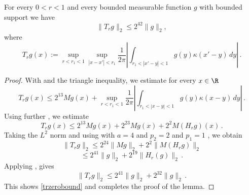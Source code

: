 \begin{lemma}\label{simple-nontangential-Hilbert}
    For every $0<r<1$ and every bounded measurable function $g$ with bounded support we have
\begin{equation}\label{trzerobound}
    \|T_{r}g\|_2\le 2^{42}\|g\|_2,
\end{equation}
where
\begin{equation}\label{eq-simple--nontangential}
    T_{r} g(x):=\sup_{r<r_1<1}\sup_{|x-x'|<r_1}\frac 1{2\pi} \left|\int_{r_1<|x'-y|<1}
g(y) \kappa(x'-y)\, dy\right|\, .
\end{equation}
\end{lemma}
\begin{proof}
With 
and the triangle inequality, we estimate
for every $x\in \R$
\begin{equation}
     T_{r} g(x)
     \le 2^{13} Mg(x)+\sup_{r<r_1<1}
     \frac 1{2\pi} \left|\int_{r_1<|x-y|<1}
g(y) \kappa(x-y)\, dy\right|\, .
\end{equation}
Using further ,
we estimate
\begin{equation}
      T_{r} g(x)
     \le 2^{13} Mg(x)+2^{23}
     Mg(x)+2^{2}M(H_{r}g)(x)\, .
\end{equation}
Taking the $L^2$ norm and using with $a=4$ and $p_2=2$ and $p_1=1$ , we obtain
\begin{equation}
      \|T_{r} g\|_2
     \le 2^{24} \|Mg\|_2+2^{2}\|M(H_{r}g)\|_2
\end{equation}
\begin{equation}
     \le 2^{41} \|g\|_2+2^{19}\|H_{r}(g)\|_2\, .
\end{equation}
Applying , gives
\begin{equation}
      \|T_{r} g\|_2\le 2^{41} \|g\|_2+2^{32}\|g\|_2\, .
\end{equation}
This shows \eqref{trzerobound} and completes the proof of the lemma.
\end{proof}

